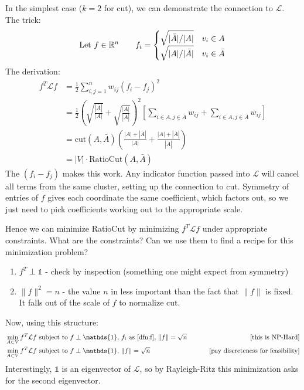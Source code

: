 \documentclass{article}
\begin{document}
In the simplest case ($k=2$ for cut), we can demonstrate the connection to $\mathcal{L}$. \\The trick:
\begin{equation} \label{dfn:f}
    \text{Let $f \in {\mathbb R}^n$} \qquad f_i = \begin{cases}
        \sqrt{|\bar{A}|/|A|} & v_i \in A \\
        \sqrt{|A|/|\bar{A}|} & v_i \in \bar{A}
    \end{cases}
\end{equation}
The derivation:
\begin{align}
    f^T \mathcal{L} f & = \frac{1}{2} \sum_{i, j = 1}^n w_{ij}(f_i - f_j)^2 \\
    & = \frac{1}{2} \left( \sqrt{\frac{|\bar{A}|}{|A|}} +  \sqrt{\frac{|A|}{|\bar{A}|}} \right)^2 \left[ \sum_{i \in A, j \in \bar{A}} w_{ij} + \sum_{i \in A, j \in \bar{A}} w_{ij} \right] \\
    & = \text{cut}(A, \bar{A}) \left( \frac{|A| + |\bar{A}|}{|A|} + \frac{|A| + |\bar{A}|}{|\bar{A}|} \right) \\
    & = |V| \cdot \text{RatioCut}(A, \bar{A})
\end{align}
The $(f_i - f_j)$ makes this work. Any indicator function passed into $\mathcal{L}$ will cancel all terms from the same cluster, setting up the connection to cut. Symmetry of entries of $f$ gives each coordinate the same coefficient, which factors out, so we just need to pick coefficients working out to the appropriate scale.

Hence we can minimize RatioCut by minimizing $f^T \mathcal{L} f$ under appropriate constraints. What are the constraints? Can we use them to find a recipe for this minimization problem?
\begin{enumerate}
    \item $f^T \perp \mathds{1}$ - check by inspection (something one might expect from symmetry)
    \item $\|f\|^2 = n$ - the value $n$ in less important than the fact that $\|f\|$ is fixed. It falls out of the scale of $f$ to normalize cut. 
\end{enumerate}
Now, using this structure:
\begin{align}
   &\min_{A \subset V} f^T \mathcal{L} f \text{ subject to $f \perp \mathds{1}$, $f_i$ as \eqref{dfn:f}, $\|f\|=\sqrt{n}$ }  \qquad &\text{[this is NP-Hard]} \\
   &\min_{A \subset V} f^T \mathcal{L} f \text{ subject to $f \perp \mathds{1}$, $\|f\|=\sqrt{n}$ }  \qquad &\text{[pay discreteness for feasibility]} 
\end{align}
Interestingly, $\mathds{1}$ is an eigenvector of $\mathcal{L}$, so by Rayleigh-Ritz this minimization asks for the second eigenvector.
\end{document}

